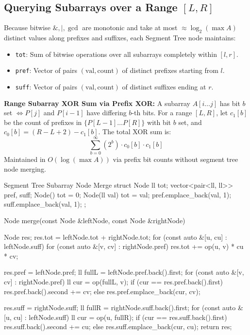 \documentclass[10pt]{article}
\newcommand{\complexity}[1]{%
  \tcbox[on line,
    colback=tagbg,
    colframe=tagbg,
    boxrule=0pt,
    arc=2pt,
    boxsep=0pt,
    left=3.5pt, right=3.5pt, top=1.5pt, bottom=1.5pt
  ]{\color{tagtext}\scriptsize\bfseries\ensuremath{#1}}%
}
\begin{document}
\subsection{Querying Subarrays over a Range \texorpdfstring{$[L, R]$}{[L, R]}}

Because bitwise $\&, |, \gcd$ are monotonic and take at most $\approx \log_2(\max A)$ distinct values along prefixes and suffixes, each Segment Tree node maintains:
\begin{itemize}
    \item \texttt{tot}: Sum of bitwise operations over all subarrays completely within $[l, r]$.
    \item \texttt{pref}: Vector of pairs $(\text{val}, \text{count})$ of distinct prefixes starting from $l$.
    \item \texttt{suff}: Vector of pairs $(\text{val}, \text{count})$ of distinct suffixes ending at $r$.
\end{itemize}

\begin{resultbox}
    \textbf{Range Subarray XOR Sum via Prefix XOR:} 
    A subarray $A[i \dots j]$ has bit $b$ set $\iff P[j]$ and $P[i-1]$ have differing $b$-th bits. For a range $[L, R]$, let $c_1[b]$ be the count of prefixes in $\{P[L-1] \dots P[R]\}$ with bit $b$ set, and $c_0[b] = (R - L + 2) - c_1[b]$. The total XOR sum is:
    \[ \sum_{b=0}^{\infty} (2^b) \cdot c_0[b] \cdot c_1[b] \]
    Maintained in $O(\log(\max A))$ via prefix bit counts without segment tree node merging.
\end{resultbox}

\begin{vscode}{Segment Tree Subarray Node Merge \complexity{O(\log^2(\max A))}}
struct Node
{
    ll tot;
    vector<pair<ll, ll>> pref, suff;
    Node() { tot = 0; }
    Node(ll val) 
    { 
        tot = val; 
        pref.emplace_back(val, 1);
        suff.emplace_back(val, 1);
    }
};

Node merge(const Node &leftNode, const Node &rightNode)
{
    Node res;
    res.tot = leftNode.tot + rightNode.tot;
    for (const auto &[u, cu] : leftNode.suff)
    {
        for (const auto &[v, cv] : rightNode.pref)
            res.tot += op(u, v) * cu * cv;
    }

    res.pref = leftNode.pref;
    ll fullL = leftNode.pref.back().first;
    for (const auto &[v, cv] : rightNode.pref)
    {
        ll cur = op(fullL, v);
        if (cur == res.pref.back().first)
            res.pref.back().second += cv;
        else
            res.pref.emplace_back(cur, cv);
    }

    res.suff = rightNode.suff;
    ll fullR = rightNode.suff.back().first;
    for (const auto &[u, cu] : leftNode.suff)
    {
        ll cur = op(u, fullR);
        if (cur == res.suff.back().first)
            res.suff.back().second += cu;
        else
            res.suff.emplace_back(cur, cu);
    }
    return res;
}
\end{vscode}
\end{document}
